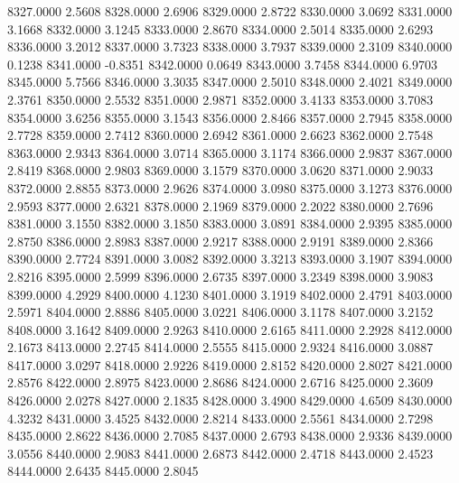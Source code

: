8327.0000      2.5608
8328.0000      2.6906
8329.0000      2.8722
8330.0000      3.0692
8331.0000      3.1668
8332.0000      3.1245
8333.0000      2.8670
8334.0000      2.5014
8335.0000      2.6293
8336.0000      3.2012
8337.0000      3.7323
8338.0000      3.7937
8339.0000      2.3109
8340.0000      0.1238
8341.0000     -0.8351
8342.0000      0.0649
8343.0000      3.7458
8344.0000      6.9703
8345.0000      5.7566
8346.0000      3.3035
8347.0000      2.5010
8348.0000      2.4021
8349.0000      2.3761
8350.0000      2.5532
8351.0000      2.9871
8352.0000      3.4133
8353.0000      3.7083
8354.0000      3.6256
8355.0000      3.1543
8356.0000      2.8466
8357.0000      2.7945
8358.0000      2.7728
8359.0000      2.7412
8360.0000      2.6942
8361.0000      2.6623
8362.0000      2.7548
8363.0000      2.9343
8364.0000      3.0714
8365.0000      3.1174
8366.0000      2.9837
8367.0000      2.8419
8368.0000      2.9803
8369.0000      3.1579
8370.0000      3.0620
8371.0000      2.9033
8372.0000      2.8855
8373.0000      2.9626
8374.0000      3.0980
8375.0000      3.1273
8376.0000      2.9593
8377.0000      2.6321
8378.0000      2.1969
8379.0000      2.2022
8380.0000      2.7696
8381.0000      3.1550
8382.0000      3.1850
8383.0000      3.0891
8384.0000      2.9395
8385.0000      2.8750
8386.0000      2.8983
8387.0000      2.9217
8388.0000      2.9191
8389.0000      2.8366
8390.0000      2.7724
8391.0000      3.0082
8392.0000      3.3213
8393.0000      3.1907
8394.0000      2.8216
8395.0000      2.5999
8396.0000      2.6735
8397.0000      3.2349
8398.0000      3.9083
8399.0000      4.2929
8400.0000      4.1230
8401.0000      3.1919
8402.0000      2.4791
8403.0000      2.5971
8404.0000      2.8886
8405.0000      3.0221
8406.0000      3.1178
8407.0000      3.2152
8408.0000      3.1642
8409.0000      2.9263
8410.0000      2.6165
8411.0000      2.2928
8412.0000      2.1673
8413.0000      2.2745
8414.0000      2.5555
8415.0000      2.9324
8416.0000      3.0887
8417.0000      3.0297
8418.0000      2.9226
8419.0000      2.8152
8420.0000      2.8027
8421.0000      2.8576
8422.0000      2.8975
8423.0000      2.8686
8424.0000      2.6716
8425.0000      2.3609
8426.0000      2.0278
8427.0000      2.1835
8428.0000      3.4900
8429.0000      4.6509
8430.0000      4.3232
8431.0000      3.4525
8432.0000      2.8214
8433.0000      2.5561
8434.0000      2.7298
8435.0000      2.8622
8436.0000      2.7085
8437.0000      2.6793
8438.0000      2.9336
8439.0000      3.0556
8440.0000      2.9083
8441.0000      2.6873
8442.0000      2.4718
8443.0000      2.4523
8444.0000      2.6435
8445.0000      2.8045
